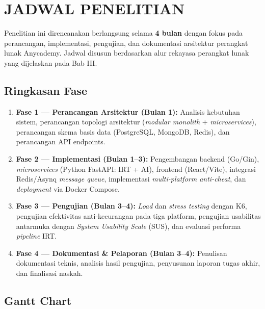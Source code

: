 \chapter{JADWAL PENELITIAN}

Penelitian ini direncanakan berlangsung selama \textbf{4 bulan} dengan fokus pada perancangan, implementasi, pengujian, dan dokumentasi arsitektur perangkat lunak Anycademy. Jadwal disusun berdasarkan alur rekayasa perangkat lunak yang dijelaskan pada Bab III.

\section{Ringkasan Fase}

\begin{enumerate}
	\item \textbf{Fase 1 --- Perancangan Arsitektur (Bulan 1):} Analisis kebutuhan sistem, perancangan topologi arsitektur (\textit{modular monolith} + \textit{microservices}), perancangan skema basis data (PostgreSQL, MongoDB, Redis), dan perancangan API endpoints.

	\item \textbf{Fase 2 --- Implementasi (Bulan 1--3):} Pengembangan backend (Go/Gin), \textit{microservices} (Python FastAPI: IRT + AI), frontend (React/Vite), integrasi Redis/Asynq \textit{message queue}, implementasi \textit{multi-platform anti-cheat}, dan \textit{deployment} via Docker Compose.

	\item \textbf{Fase 3 --- Pengujian (Bulan 3--4):} \textit{Load} dan \textit{stress testing} dengan K6, pengujian efektivitas anti-kecurangan pada tiga platform, pengujian usabilitas antarmuka dengan \textit{System Usability Scale} (SUS), dan evaluasi performa \textit{pipeline} IRT.

	\item \textbf{Fase 4 --- Dokumentasi \& Pelaporan (Bulan 3--4):} Penulisan dokumentasi teknis, analisis hasil pengujian, penyusunan laporan tugas akhir, dan finalisasi naskah.
\end{enumerate}

\section{Gantt Chart}

